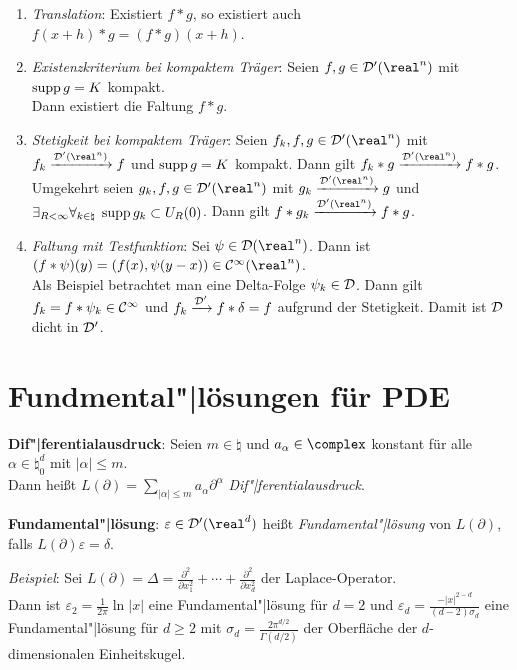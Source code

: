 \begin{enumerate}
    \item
    \emph{Translation}:
    Existiert $f \ast g$, so existiert auch
    $f(x + h) \ast g = (f \ast g)(x + h)$.

    \item
    \emph{Existenzkriterium bei kompaktem Träger}:
    Seien $f, g \in \D'(\real^n)$ mit $\operatorname{supp} g = K$ kompakt.\\
    Dann existiert die Faltung $f \ast g$.

    \item
    \emph{Stetigkeit bei kompaktem Träger}:
    Seien $f_k, f, g \in \D'(\real^n)$ mit $f_k \xrightarrow{\D'(\real^n)} f$
    und $\operatorname{supp} g = K$ kompakt.
    Dann gilt $f_k \ast g \xrightarrow{\D'(\real^n)} f \ast g$.
    Umgekehrt seien $g_k, f, g \in \D'(\real^n)$ mit
    $g_k \xrightarrow{\D'(\real^n)} g$
    und $\exists_{R < \infty} \forall_{k \in \natural}\;
    \operatorname{supp} g_k \subset U_R(0)$.
    Dann gilt $f \ast g_k \xrightarrow{\D'(\real^n)} f \ast g$.

    \item
    \emph{Faltung mit Testfunktion}:
    Sei $\psi \in \D(\real^n)$.
    Dann ist $(f \ast \psi)(y) = (f(x), \psi(y - x)) \in \C^\infty(\real^n)$.\\
    Als Beispiel betrachtet man eine Delta-Folge $\psi_k \in \mathcal{D}$.
    Dann gilt $f_k = f \ast \psi_k \in \mathcal{C}^\infty$ und
    $f_k \xrightarrow{\mathcal{D}'} f \ast \delta = f$ aufgrund der Stetigkeit.
    Damit ist $\mathcal{D}$ dicht in $\mathcal{D}'$.
\end{enumerate}

\section{%
    Fundmental"|lösungen für PDE%
}

\textbf{Dif"|ferentialausdruck}:
Seien $m \in \natural$ und $a_\alpha \in \complex$ konstant für alle
$\alpha \in \natural_0^d$ mit $|\alpha| \le m$.\\
Dann heißt $L(\partial) = \sum_{|\alpha| \le m} a_\alpha \partial^\alpha$
\emph{Dif"|ferentialausdruck}.

\textbf{Fundamental"|lösung}:
$\varepsilon \in \D'(\real^d)$ heißt \emph{Fundamental"|lösung} von
$L(\partial)$, falls $L(\partial) \varepsilon = \delta$.

\emph{Beispiel}: Sei $L(\partial) = \Delta =
\frac{\partial^2}{\partial x_1^2} + \dotsb +
\frac{\partial^2}{\partial x_d^2}$ der Laplace-Operator.\\
Dann ist $\varepsilon_2 = \frac{1}{2\pi} \ln |x|$
eine Fundamental"|lösung für $d = 2$ und
$\varepsilon_d = \frac{-|x|^{2-d}}{(d - 2)\sigma_d}$
eine Fundamental"|lösung für $d \ge 2$ mit
$\sigma_d = \frac{2\pi^{d/2}}{\Gamma(d/2)}$
der Oberfläche der $d$-dimensionalen Einheitskugel.

